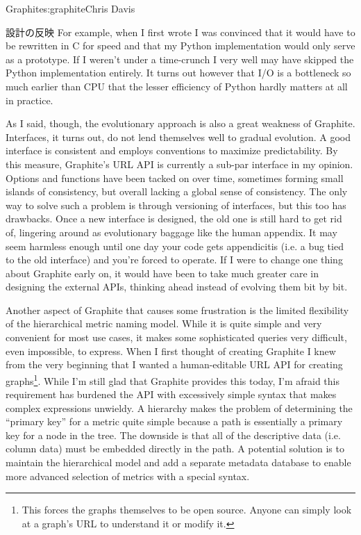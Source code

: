\begin{aosachapter}{Graphite}{s:graphite}{Chris Davis}
\begin{aosasect1}{設計の反映}
For example, when I first wrote  I was convinced that it would
have to be rewritten in C for speed and that my Python implementation
would only serve as a prototype. If I weren't under a time-crunch I
very well may have skipped the Python implementation entirely. It
turns out however that I/O is a bottleneck so much earlier than CPU
that the lesser efficiency of Python hardly matters at all in
practice.

As I said, though, the evolutionary approach is also a great weakness
of Graphite. Interfaces, it turns out, do not lend themselves well to
gradual evolution. A good interface is consistent and employs
conventions to maximize predictability. By this measure, Graphite's
URL API is currently a sub-par interface in my opinion. Options and
functions have been tacked on over time, sometimes forming small
islands of consistency, but overall lacking a global sense of
consistency. The only way to solve such a problem is through
versioning of interfaces, but this too has drawbacks. Once a new
interface is designed, the old one is still hard to get rid of,
lingering around as evolutionary baggage like the human appendix. It
may seem harmless enough until one day your code gets appendicitis
(i.e. a bug tied to the old interface) and you're forced to
operate. If I were to change one thing about Graphite early on, it
would have been to take much greater care in designing the external
APIs, thinking ahead instead of evolving them bit by bit.

Another aspect of Graphite that causes some frustration is the limited
flexibility of the hierarchical metric naming model. While it is quite
simple and very convenient for most use cases, it makes some
sophisticated queries very difficult, even impossible, to
express. When I first thought of creating Graphite I knew from the
very beginning that I wanted a human-editable URL API for creating
graphs\footnote{This forces the graphs themselves to be open
source. Anyone can simply look at a graph's URL to understand it or
modify it.}. While I'm still glad that Graphite provides this today,
I'm afraid this requirement has burdened the API with excessively
simple syntax that makes complex expressions unwieldy.  A hierarchy
makes the problem of determining the ``primary key'' for a metric
quite simple because a path is essentially a primary key for a node in
the tree. The downside is that all of the descriptive data (i.e.
column data) must be embedded directly in the path. A potential
solution is to maintain the hierarchical model and add a separate
metadata database to enable more advanced selection of metrics with a
special syntax.


\end{aosasect1}
\end{aosachapter}

